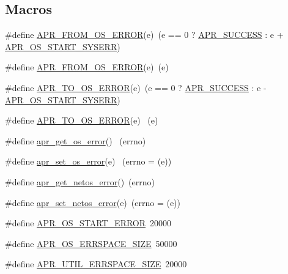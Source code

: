 \subsection*{Macros}
\begin{DoxyCompactItemize}
\item 
\#define \hyperlink{group__apr__errno_ga2096daff578ef301e060b80c7a4525bf}{A\+P\+R\+\_\+\+F\+R\+O\+M\+\_\+\+O\+S\+\_\+\+E\+R\+R\+OR}(e)~(e == 0 ? \hyperlink{group__apr__errno_ga9ee311b7bf1c691dc521d721339ee2a6}{A\+P\+R\+\_\+\+S\+U\+C\+C\+E\+SS} \+: e + \hyperlink{group__apr__errno_gad70a5cad6862a9abcc254d35e827ac8b}{A\+P\+R\+\_\+\+O\+S\+\_\+\+S\+T\+A\+R\+T\+\_\+\+S\+Y\+S\+E\+RR})
\item 
\#define \hyperlink{group__apr__errno_ga2096daff578ef301e060b80c7a4525bf}{A\+P\+R\+\_\+\+F\+R\+O\+M\+\_\+\+O\+S\+\_\+\+E\+R\+R\+OR}(e)~(e)
\item 
\#define \hyperlink{group__apr__errno_ga2385cae04b04afbdcb65f1a45c4d8506}{A\+P\+R\+\_\+\+T\+O\+\_\+\+O\+S\+\_\+\+E\+R\+R\+OR}(e)~(e == 0 ? \hyperlink{group__apr__errno_ga9ee311b7bf1c691dc521d721339ee2a6}{A\+P\+R\+\_\+\+S\+U\+C\+C\+E\+SS} \+: e -\/ \hyperlink{group__apr__errno_gad70a5cad6862a9abcc254d35e827ac8b}{A\+P\+R\+\_\+\+O\+S\+\_\+\+S\+T\+A\+R\+T\+\_\+\+S\+Y\+S\+E\+RR})
\item 
\#define \hyperlink{group__apr__errno_ga5b08e985b7a8c59c817abf99a16b758d}{A\+P\+R\+\_\+\+T\+O\+\_\+\+O\+S\+\_\+\+E\+R\+R\+OR}(e)    ~(e)
\item 
\#define \hyperlink{group__apr__errno_ga8d5ccb0b1ce67ba5ee6d51473baa6c3c}{apr\+\_\+get\+\_\+os\+\_\+error}()    ~(errno)
\item 
\#define \hyperlink{group__apr__errno_gaea601f23bedeaca52fd1f5d705ec7543}{apr\+\_\+set\+\_\+os\+\_\+error}(e)  ~(errno = (e))
\item 
\#define \hyperlink{group__apr__errno_ga66e54f155b4a80ac7df9118af9bd896a}{apr\+\_\+get\+\_\+netos\+\_\+error}()~(errno)
\item 
\#define \hyperlink{group__apr__errno_gaafc38481621653ece6f592f9c5a9a09b}{apr\+\_\+set\+\_\+netos\+\_\+error}(e)~(errno = (e))
\item 
\#define \hyperlink{group__apr__errno_ga191894048b7bd0cca3cf0bdff1eb695b}{A\+P\+R\+\_\+\+O\+S\+\_\+\+S\+T\+A\+R\+T\+\_\+\+E\+R\+R\+OR}~20000
\item 
\#define \hyperlink{group__apr__errno_gadb8d97e6836ccdc57b43b6119a5acccf}{A\+P\+R\+\_\+\+O\+S\+\_\+\+E\+R\+R\+S\+P\+A\+C\+E\+\_\+\+S\+I\+ZE}~50000
\item 
\#define \hyperlink{group__apr__errno_gaef5e79630739f24d1512d0d044c2bae7}{A\+P\+R\+\_\+\+U\+T\+I\+L\+\_\+\+E\+R\+R\+S\+P\+A\+C\+E\+\_\+\+S\+I\+ZE}~20000

\end{DoxyCompactItemize}
